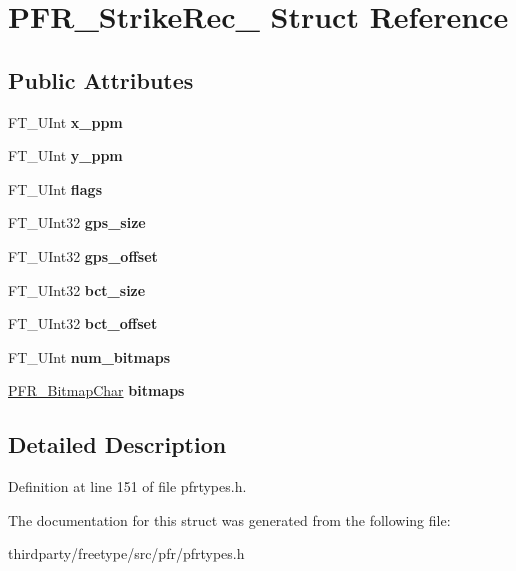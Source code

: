 \hypertarget{struct_p_f_r___strike_rec__}{}\section{P\+F\+R\+\_\+\+Strike\+Rec\+\_\+ Struct Reference}
\label{struct_p_f_r___strike_rec__}
\subsection*{Public Attributes}
\begin{DoxyCompactItemize}
\item 
\mbox{\label{struct_p_f_r___strike_rec___a392bce3bde29f77de3d0e33078eb89b9}} 
F\+T\+\_\+\+U\+Int {\bfseries x\+\_\+ppm}
\item 
\mbox{\label{struct_p_f_r___strike_rec___ade03eead80d7520ae32d5820341f99b1}} 
F\+T\+\_\+\+U\+Int {\bfseries y\+\_\+ppm}
\item 
\mbox{\label{struct_p_f_r___strike_rec___a4978cd3ba578d22e24827d7733fd5be6}} 
F\+T\+\_\+\+U\+Int {\bfseries flags}
\item 
\mbox{\label{struct_p_f_r___strike_rec___ab2edcd01036cd953cb93cadb6d2c1870}} 
F\+T\+\_\+\+U\+Int32 {\bfseries gps\+\_\+size}
\item 
\mbox{\label{struct_p_f_r___strike_rec___a6dfe98ff7efc1f5493abad52b024d546}} 
F\+T\+\_\+\+U\+Int32 {\bfseries gps\+\_\+offset}
\item 
\mbox{\label{struct_p_f_r___strike_rec___a8a1097ec2913865e841dccdc38a44890}} 
F\+T\+\_\+\+U\+Int32 {\bfseries bct\+\_\+size}
\item 
\mbox{\label{struct_p_f_r___strike_rec___acdbdf669bcc9a1e06370be148ad1c47f}} 
F\+T\+\_\+\+U\+Int32 {\bfseries bct\+\_\+offset}
\item 
\mbox{\label{struct_p_f_r___strike_rec___a099a41bf4a8b776aeb7dec9beb2ad993}} 
F\+T\+\_\+\+U\+Int {\bfseries num\+\_\+bitmaps}
\item 
\mbox{\label{struct_p_f_r___strike_rec___a300ff4329c0e21d3f256554213f6364d}} 
\hyperlink{struct_p_f_r___bitmap_char_rec__}{P\+F\+R\+\_\+\+Bitmap\+Char} {\bfseries bitmaps}
\end{DoxyCompactItemize}


\subsection{Detailed Description}


Definition at line 151 of file pfrtypes.\+h.



The documentation for this struct was generated from the following file\+:\begin{DoxyCompactItemize}
\item 
thirdparty/freetype/src/pfr/pfrtypes.\+h\end{DoxyCompactItemize}

